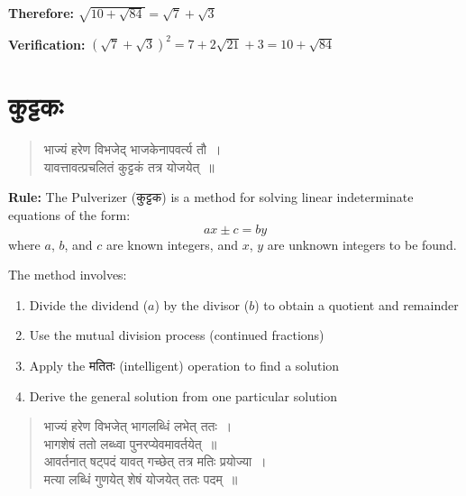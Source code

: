 \documentclass[11pt,a4paper]{article}
\newcommand{\dev}[1]{{\devanagarifont #1}}
\begin{document}
\textbf{Therefore:} $\sqrt{10 + \sqrt{84}} = \sqrt{7} + \sqrt{3}$

\textbf{Verification:} $(\sqrt{7} + \sqrt{3})^2 = 7 + 2\sqrt{21} + 3 = 10 + \sqrt{84}$ \checkmark

\clearpage

\section*{\dev{कुट्टकः}}
\addcontentsline{toc}{section}{\dev{कुट्टकः}}

\begin{verse}
\devanagarifont
\centering
\color{versecolor}
\dev{भाज्यं हरेण विभजेद् भाजकेनापवर्त्य तौ~।}\\
\dev{यावत्तावत्प्रचलितं कुट्टकं तत्र योजयेत्~॥}
\end{verse}

\textbf{Rule:} The Pulverizer (\dev{कुट्टक}) is a method for solving linear indeterminate equations of the form:
\[
ax \pm c = by
\]
where $a$, $b$, and $c$ are known integers, and $x$, $y$ are unknown integers to be found.

\vspace{0.3cm}

The method involves:
\begin{enumerate}
  \item Divide the dividend ($a$) by the divisor ($b$) to obtain a quotient and remainder
  \item Use the mutual division process (continued fractions)
  \item Apply the \dev{मतितः} (intelligent) operation to find a solution
  \item Derive the general solution from one particular solution
\end{enumerate}

\vspace{0.3cm}

\begin{verse}
\devanagarifont
\centering
\color{versecolor}
\dev{भाज्यं हरेण विभजेत् भागलब्धिं लभेत् ततः~।}\\
\dev{भागशेषं ततो लब्ध्वा पुनरप्येवमावर्तयेत्~॥}\\[0.3cm]
\dev{आवर्तनात् षट्पदं यावत् गच्छेत् तत्र मतिः प्रयोज्या~।}\\
\dev{मत्या लब्धिं गुणयेत् शेषं योजयेत् ततः पदम्~॥}
\end{verse}
\end{document}
